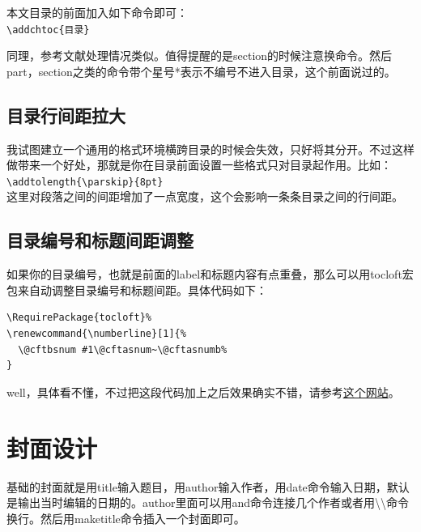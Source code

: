 \documentclass[11pt,oneside]{book}
\begin{document}
本文目录的前面加入如下命令即可：\\
\verb+\addchtoc{目录}+

同理，参考文献处理情况类似。值得提醒的是section的时候注意换命令。然后part，section之类的命令带个星号*表示不编号不进入目录，这个前面说过的。

\section{目录行间距拉大}
我试图建立一个通用的格式环境横跨目录的时候会失效，只好将其分开。不过这样做带来一个好处，那就是你在目录前面设置一些格式只对目录起作用。比如：\\
\verb+\addtolength{\parskip}{8pt}+\\
这里对段落之间的间距增加了一点宽度，这个会影响一条条目录之间的行间距。


\section{目录编号和标题间距调整}
如果你的目录编号，也就是前面的label和标题内容有点重叠，那么可以用tocloft宏包来自动调整目录编号和标题间距。具体代码如下：
\begin{Verbatim}
\RequirePackage{tocloft}%
\renewcommand{\numberline}[1]{%
  \@cftbsnum #1\@cftasnum~\@cftasnumb%
}
\end{Verbatim}

well，具体看不懂，不过把这段代码加上之后效果确实不错，请参考\href{http://tex.stackexchange.com/questions/64115/table-of-contents-chapter-number-width}{这个网站}。




\chapter{封面设计}
基础的封面就是用title输入题目，用author输入作者，用date命令输入日期，默认是输出当时编辑的日期的。author里面可以用and命令连接几个作者或者用\textbackslash \textbackslash 命令换行。然后用maketitle命令插入一个封面即可。
\end{document}
